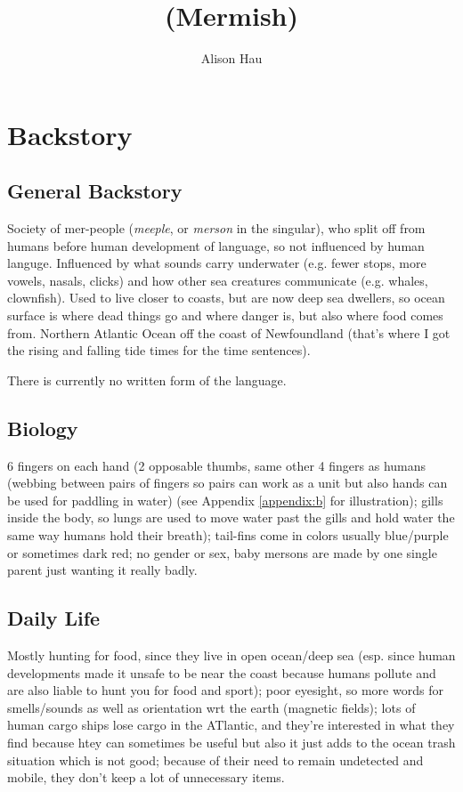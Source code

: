 \documentclass[11pt]{report}
\title{\textipa{m\R{}mIS} (Mermish)}
\author{Alison Hau}
\date{}
\begin{document}
\maketitle

\setcounter{tocdepth}{1}
\tableofcontents

\chapter{Backstory}
\section{General Backstory}
Society of mer-people (\textit{meeple}, or \textit{merson} in the singular), who split off from humans before human development of language, so not influenced by human languge.  Influenced by what sounds carry underwater (e.g. fewer stops, more vowels, nasals, clicks) and how other sea creatures communicate (e.g. whales, clownfish).  Used to live closer to coasts, but are now deep sea dwellers, so ocean surface is where dead things go and where danger is, but also where food comes from.  Northern Atlantic Ocean off the coast of Newfoundland (that's where I got the rising and falling tide times for the time sentences).

There is currently no written form of the language.

\section{Biology}
6 fingers on each hand (2 opposable thumbs, same other 4 fingers as humans (webbing between pairs of fingers so pairs can work as a unit but also hands can be used for paddling in water) (see Appendix \ref{appendix:b} for illustration); gills inside the body, so lungs are used to move water past the gills and hold water the same way humans hold their breath); tail-fins come in colors usually blue/purple or sometimes dark red; no gender or sex, baby mersons are made by one single parent just wanting it really badly.

\section{Daily Life}
Mostly hunting for food, since they live in open ocean/deep sea (esp. since human developments made it unsafe to be near the coast because humans pollute and are also liable to hunt you for food and sport); poor eyesight, so more words for smells/sounds as well as orientation wrt the earth (magnetic fields); lots of human cargo ships lose cargo in the ATlantic, and they're interested in what they find because htey can sometimes be useful but also it just adds to the ocean trash situation which is not good; because of their need to remain undetected and mobile, they don't keep a lot of unnecessary items.
\end{document}
